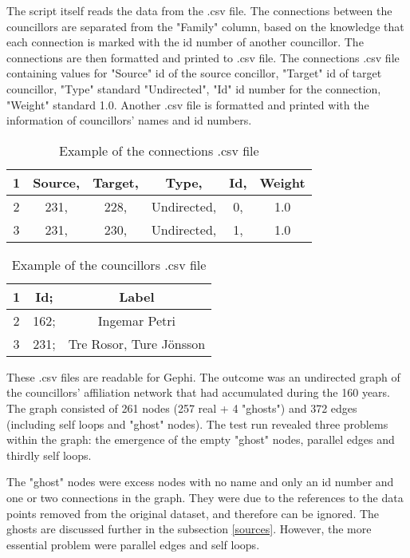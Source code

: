 The script itself reads the data from the .csv file. The connections between the councillors are separated from the "Family" column, based on the knowledge that each connection is marked with the id number of another councillor. The connections are then formatted and printed to .csv file. The connections .csv file containing values for "Source" id of the source concillor, "Target" id of target councillor, "Type" standard "Undirected", "Id" id number for the connection, "Weight" standard 1.0. Another .csv file is formatted and printed with the information of councillors' names and id numbers.

\begin{table}[h]
	\caption{Example of the connections .csv file}
	\centering
	\begin{tabular}{cccccc}
		\hline
		1 &Source, &Target, &Type, &Id, &Weight \\
		\hline
		2 &231, &228, &Undirected, &0, &1.0 \\
		\hline
		3 &231, &230, &Undirected, &1, &1.0 \\
		\hline
	\end{tabular}
\end{table}
\begin{table}[h]
	\caption{Example of the councillors .csv file}
	\centering
	\begin{tabular}{ccc}	
		\hline
		1 &Id; &Label \\
		\hline
		2 &162; &Ingemar Petri \\
		\hline
		3 &231; &Tre Rosor, Ture Jönsson \\
		\hline
	\end{tabular}
\end{table}

These .csv files are readable for Gephi. The outcome was an undirected graph of the councillors' affiliation network that had accumulated during the 160 years. The graph consisted of 261 nodes (257 real + 4 "ghosts") and 372 edges (including self loops and "ghost" nodes). The test run revealed three problems within the graph: the emergence of the empty "ghost" nodes, parallel edges and thirdly self loops. 

The "ghost" nodes were excess nodes with no name and only an id number and one or two connections in the graph. They were due to the references to the data points removed from the original dataset, and therefore can be ignored. The ghosts are discussed further in the subsection \ref{sources}. However, the more essential problem were parallel edges and self loops.

